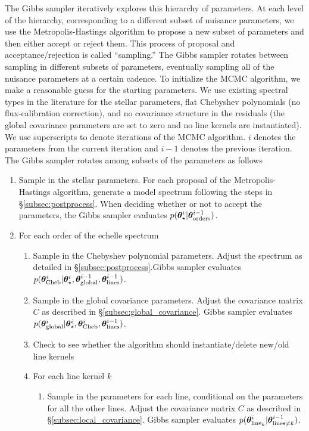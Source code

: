 \documentclass[iop,floatfix]{emulateapj}
\newcommand{\vt}{ {\bm \theta}}
\newcommand{\vtstar}{\vt_{\star}}
\newcommand{\vtcheb}{\vt_{\rm Cheb}}
\newcommand{\vtglobal}{\vt_{\rm global}}
\newcommand{\vtorders}{\vt_{\rm orders}}
\newcommand{\vtline}[1]{\vt_{{\rm line}_{#1}}}
\newcommand{\vtlines}{\vt_{\rm lines}}
\begin{document}
The Gibbs sampler iteratively explores this hierarchy of parameters. At each level of the hierarchy, corresponding to a different subset of nuisance parameters, we use the Metropolis-Hastings algorithm to propose a new subset of parameters and then either accept or reject them. This process of proposal and acceptance/rejection is called ``sampling.'' The Gibbs sampler rotates between sampling in different subsets of parameters, eventually sampling all of the nuisance parameters at a certain cadence. To initialize the MCMC algorithm, we make a reasonable guess for the starting parameters. We use existing spectral types in the literature for the stellar parameters, flat Chebyshev polynomials (no flux-calibration correction), and no covariance structure in the residuals (the global covariance parameters are set to zero and no line kernels are instantiated). We use superscripts to denote iterations of the MCMC algorithm. $i$ denotes the parameters from the current iteration and $i - 1$ denotes the previous iteration. The Gibbs sampler rotates among subsets of the parameters as follows 

\begin{enumerate}
  \item Sample in the stellar parameters. For each proposal of the Metropolis-Hastings algorithm, generate a model spectrum following the steps in \S\ref{subsec:postprocess}. When deciding whether or not to accept the parameters, the Gibbs sampler evaluates $p(\vtstar^i | \vtorders^{i-1})$.
  \item For each order of the echelle spectrum
    \begin{enumerate}
      \item Sample in the Chebyshev polynomial parameters. Adjust the spectrum as detailed in \S\ref{subsec:postprocess}.Gibbs sampler evaluates $p(\vtcheb^{i} | \vtstar^{i}, \vtglobal^{i -1}, \vtlines^{i-1})$.
      \item Sample in the global covariance parameters. Adjust the covariance matrix $C$ as described in \S\ref{subsec:global_covariance}. Gibbs sampler evaluates $p(\vtglobal^{i}| \vtstar^{i}, \vtcheb^{i}, \vtlines^{i -1})$.

      \item Check to see whether the algorithm should instantiate/delete new/old line kernels
      \item For each line kernel $k$
	\begin{enumerate}
	  \item Sample in the parameters for each line, conditional on the parameters for all the other lines. Adjust the covariance matrix $C$ as described in \S\ref{subsec:local_covariance}. Gibbs sampler evaluates $p(\vtline{k}^i| \vt_{\textrm{lines}\ne k}^{i - 1})$.
	\end{enumerate}
    \end{enumerate}
\end{enumerate}
\end{document}
